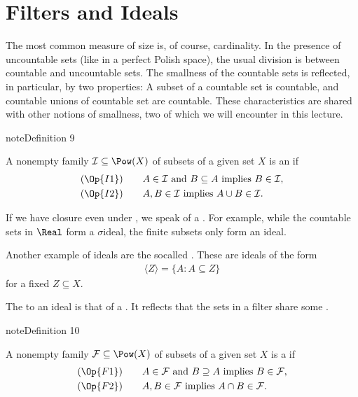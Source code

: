 \documentclass[letterpaper,10pt,english]{jupyterBook}
\begin{document}
\section{Filters and Ideals}
\label{\detokenize{measure:filters-and-ideals}}
\sphinxAtStartPar
The most common measure of size is, of course, cardinality. In the presence of uncountable sets (like in a perfect Polish space), the usual division is between countable and uncountable sets. The smallness of the countable sets is reflected, in particular, by two properties: A subset of a countable set is countable, and countable unions of countable set are countable. These characteristics are shared with other notions of smallness, two of which we will encounter in this lecture.
\label{measure:def-ideal}
\begin{sphinxadmonition}{note}{Definition 9}



\sphinxAtStartPar
A non\sphinxhyphen{}empty family \(\mathcal{I} \subseteq \Pow(X)\) of subsets of a given set \(X\) is an  if
\begin{align*}
(\Op{I1}) & \qquad A \in \mathcal{I} \text{ and } B \subseteq A \text{ implies } B \in \mathcal{I},\\
(\Op{I2}) & \qquad A, B \in \mathcal{I}  \text{ implies } A \cup B \in\mathcal{I}.
\end{align*}\end{sphinxadmonition}

\sphinxAtStartPar
If we have closure even under , we speak of a . For example, while the countable sets in \(\Real\) form a \(\sigma\)\sphinxhyphen{}ideal, the finite subsets only form an ideal.

\sphinxAtStartPar
Another example of ideals are the so\sphinxhyphen{}called . These are ideals of the form
\begin{equation*}
\begin{split}
	\langle Z \rangle = \{ A \colon A \subseteq Z\}
\end{split}
\end{equation*}
\sphinxAtStartPar
for a fixed \(Z \subseteq X\).

\sphinxAtStartPar
The  to an ideal is that of a . It reflects that the sets in a filter share some .
\label{measure:def-filter}
\begin{sphinxadmonition}{note}{Definition 10}



\sphinxAtStartPar
A non\sphinxhyphen{}empty family \(\mathcal{F} \subseteq \Pow(X)\) of subsets of a given set \(X\) is a  if
\begin{align*}
(\Op{F1}) & \qquad A \in \mathcal{F} \text{ and } B \supseteq A \text{ implies } B \in \mathcal{F},\\
(\Op{F2}) & \qquad A, B \in \mathcal{F}  \text{ implies } A \cap B \in\mathcal{F}.
\end{align*}\end{sphinxadmonition}
\end{document}
